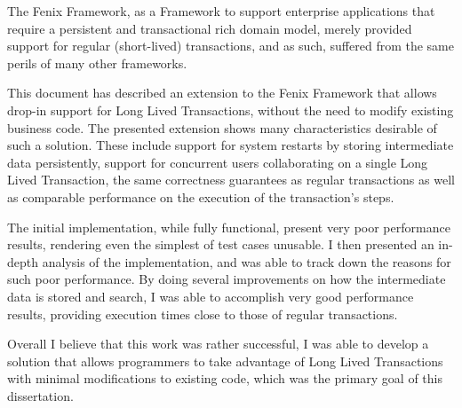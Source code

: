 \documentclass{llncs}
\begin{document}
The Fenix Framework, as a Framework to support enterprise applications
that require a persistent and transactional rich domain model, merely
provided support for regular (short-lived) transactions, and as such,
suffered from the same perils of many other frameworks.

This document has described an extension to the Fenix Framework that
allows drop-in support for Long Lived Transactions, without the need
to modify existing business code. The presented extension shows
many characteristics desirable of such a solution. These include
support for system restarts by storing intermediate data persistently,
support for concurrent users collaborating on a single Long Lived
Transaction, the same correctness guarantees as regular transactions
as well as comparable performance on the execution of the
transaction's steps.

The initial implementation, while fully functional, present very poor
performance results, rendering even the simplest of test cases
unusable. I then presented an in-depth analysis of the implementation,
and was able to track down the reasons for such poor performance. By
doing several improvements on how the intermediate data is stored and
search, I was able to accomplish very good performance results,
providing execution times close to those of regular transactions.

Overall I believe that this work was rather successful, I was able to
develop a solution that allows programmers to take advantage of Long
Lived Transactions with minimal modifications to existing code, which
was the primary goal of this dissertation.

 
\end{document}
